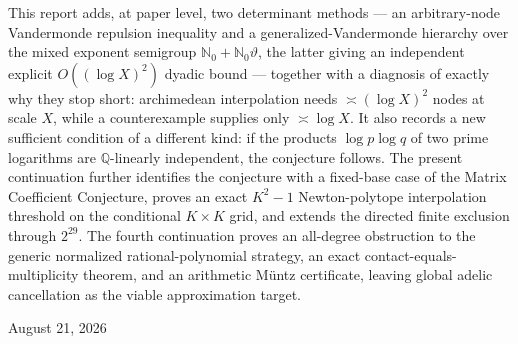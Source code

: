 \documentclass[11pt,oneside]{article}
\theoremstyle{definition}
\theoremstyle{remark}
\newcommand{\Nzero}{\mathbb N_0}
\newcommand{\Q}{\mathbb Q}
\newcommand{\thetaq}{\vartheta}
\begin{document}
\begin{titlepage}
\begin{minipage}{0.9\textwidth}
This report adds, at paper level, two determinant methods --- an arbitrary-node Vandermonde
repulsion inequality and a generalized-Vandermonde hierarchy over the mixed exponent semigroup
$\Nzero+\Nzero\thetaq$, the latter giving an independent explicit $O((\log X)^2)$ dyadic
bound --- together with a diagnosis of exactly why they stop short: archimedean interpolation
needs $\asymp(\log X)^2$ nodes at scale $X$, while a counterexample supplies only
$\asymp\log X$.  It also records a new sufficient condition of a different kind: if the
products $\log p\log q$ of two prime logarithms are $\Q$-linearly independent, the conjecture
follows.  The present continuation further identifies the conjecture with a fixed-base case of
the Matrix Coefficient Conjecture, proves an exact $K^2-1$ Newton-polytope interpolation
threshold on the conditional $K\times K$ grid, and extends the directed finite exclusion
through $2^{29}$.  The fourth continuation proves an all-degree obstruction to the generic
normalized rational-polynomial strategy, an exact contact-equals-multiplicity theorem, and an
arithmetic M\"untz certificate, leaving global adelic cancellation as the viable approximation
target.
\end{minipage}
\vfill
{\large August 21, 2026\par}
\end{titlepage}

\end{document}
